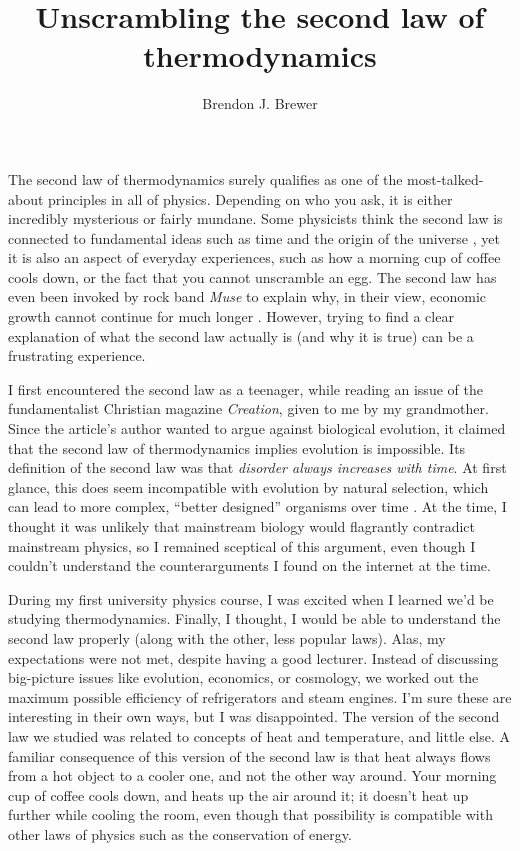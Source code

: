 \documentclass[a4paper, 12pt]{article}
\title{Unscrambling the second law of thermodynamics}
\author{Brendon J. Brewer}
\begin{document}
\sffamily
\maketitle

The second law of thermodynamics surely qualifies as one of the
most-talked-about principles in all of physics. Depending on who you ask, it is
either incredibly mysterious or fairly mundane. Some physicists think
the second law is connected to
fundamental ideas such as time and the origin of the universe
\citep{carroll}, yet it is also an aspect of everyday experiences,
such as how a morning cup of coffee cools down,
or the fact that you cannot unscramble an egg.
The second law has even been invoked by rock band {\em Muse} to
explain why, in their
view, economic growth cannot continue for much longer \citep{muse}.
However, trying to find a clear explanation of what the second law actually is
(and why it is true) can be a frustrating experience.

I first encountered the second law
as a teenager, while reading an issue of the fundamentalist Christian magazine
{\em Creation}, given to me by my grandmother. Since the article's author wanted to
argue against biological evolution, it claimed that the second law of
thermodynamics implies evolution is impossible. Its definition of the second
law was that {\em disorder always increases with time}.
At first glance, this does seem incompatible with evolution by
natural selection, which can lead to more complex,
``better designed'' organisms over time \citep{dawkins}.
At the time, I thought it was unlikely that mainstream biology would flagrantly
contradict mainstream physics, so I remained sceptical of this argument,
even though I couldn't understand the counterarguments I found on the
internet at the time.

During my first university physics course, I was excited when I learned
we'd be
studying thermodynamics. Finally, I thought, I would be able to understand the
second law properly (along with the other, less popular laws).
Alas, my expectations were not met, despite having a good lecturer.
Instead of discussing big-picture issues like evolution, economics, or
cosmology, we
worked out the maximum possible efficiency of refrigerators and steam engines.
I'm sure these are interesting in their own ways, but I was disappointed.
The version of the second law we studied was related to concepts of heat
and temperature, and little else.
A familiar consequence of this version of the second law is that
heat always flows from a hot object to a cooler
one, and not the other way around. Your morning
cup of coffee cools down, and heats up the air around it; it doesn't heat
up further while cooling the room, even though that possibility is compatible
with other laws of physics such as the conservation of energy.
\end{document}
